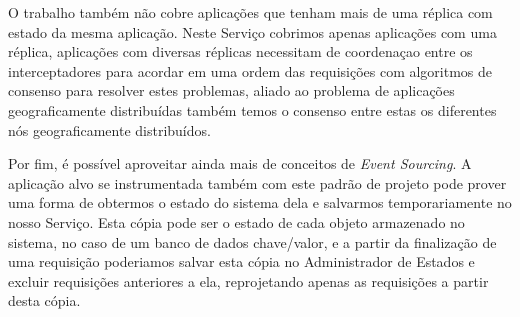 O trabalho também não cobre aplicações que tenham mais de uma réplica com estado da
mesma aplicação. Neste Serviço cobrimos apenas aplicações com uma réplica,
aplicações com diversas réplicas necessitam de coordenaçao entre os interceptadores
para acordar em uma ordem das requisições com algoritmos de consenso para resolver
estes problemas, aliado ao problema de aplicações geograficamente distribuídas
também temos o consenso entre estas os diferentes nós geograficamente distribuídos.

Por fim, é possível aproveitar ainda mais de conceitos de \textit{Event Sourcing}.
A aplicação alvo se instrumentada também com este padrão de projeto pode prover uma
forma de obtermos o estado do sistema dela e salvarmos temporariamente no nosso
Serviço. Esta cópia pode ser o estado de cada objeto armazenado no sistema, no caso
de um banco de dados chave/valor, e a partir da finalização de uma requisição poderiamos
salvar esta cópia no Administrador de Estados e excluir requisições anteriores a ela,
reprojetando apenas as requisições a partir desta cópia.
